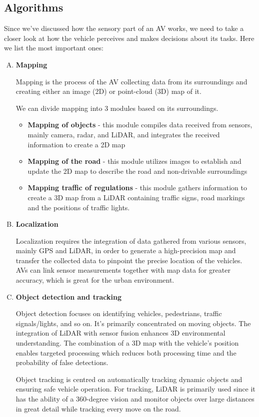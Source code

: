 \documentclass[10pt,oneside,english,a4paper]{article}
\begin{document}
\subsection{Algorithms}
\par Since we've discussed how the sensory part of an AV works, we need to take a closer look at how the vehicle perceives and makes decisions about its tasks. Here we list the most important ones:
\begin{enumerate}[A)]
    \item \textbf{Mapping}
    \par Mapping is the process of the AV collecting data from its surroundings and creating either an image (2D) or point-cloud (3D) map of it.
    \par We can divide mapping into 3 modules based on its surroundings.
    \begin{itemize}
        \item \textbf{Mapping of objects} - this module compiles data received from sensors, mainly camera, radar, and LiDAR, and integrates the received information to create a 2D map
        \item \textbf{Mapping of the road} - this module utilizes images to establish and update the 2D map to describe the road and non-drivable surroundings
        \item \textbf{Mapping traffic of regulations} - this module gathers information to create a 3D map from a LiDAR containing traffic signs, road markings and the positions of traffic lights.  
    \end{itemize}
    
    \item \textbf{Localization}
    \par Localization requires the integration of data gathered from various sensors, mainly GPS and LiDAR, in order to generate a high-precision map and transfer the collected data to pinpoint the precise location of the vehicles. AVs can link sensor measurements together with map data for greater accuracy, which is great for the urban environment.

    \item \textbf{Object detection and tracking} 
    \par Object detection focuses on identifying vehicles, pedestrians, traffic signals/lights, and so on. It's primarily concentrated on moving objects. The integration of LiDAR with sensor fusion enhances 3D environmental understanding. The combination of a 3D map with the vehicle's position enables targeted processing which reduces both processing time and the probability of false detections.
    \par Object tracking is centred on automatically tracking dynamic objects and ensuring safe vehicle operation. For tracking, LiDAR is primarily used since it has the ability of a 360-degree vision and monitor objects over large distances in great detail while tracking every move on the road.


\end{enumerate}
\end{document}
